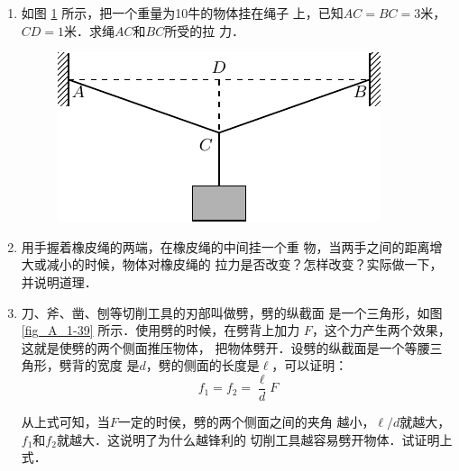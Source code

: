 \begin{enumerate}
\item 如图 \ref{fig_A_1-38} 所示，把一个重量为10牛的物体挂在绳子
上，已知$AC=BC=3$米，$CD=1$米．求绳$AC$和$BC$所受的拉
力．
\begin{figure} [htp]
\centering
\includegraphics{fig/A/1-38.pdf}
\caption{} \label{fig_A_1-38} 
\end{figure} 


\item   用手握着橡皮绳的两端，在橡皮绳的中间挂一个重
物，当两手之间的距离增大或减小的时候，物体对橡皮绳的
拉力是否改变？怎样改变？实际做一下，并说明道理．

\item  刀、斧、凿、刨等切削工具的刃部叫做劈，劈的纵截面
是一个三角形，如图 \ref{fig_A_1-39} 所示．使用劈的时候，在劈背上加力
$F$，这个力产生两个效果，这就是使劈的两个侧面推压物体，
把物体劈开．设劈的纵截面是一个等腰三角形，劈背的宽度
是$d$，劈的侧面的长度是$\ell$，可以证明：
\[f_1=f_2=\frac{\ell} {d} F \]

从上式可知，当$F$一定的时侯，劈的两个侧面之间的夹角
越小，$\ell/d$就越大，$f_1$和$f_2$就越大．这说明了为什么越锋利的
切削工具越容易劈开物体．试证明上式．




\end{enumerate}
